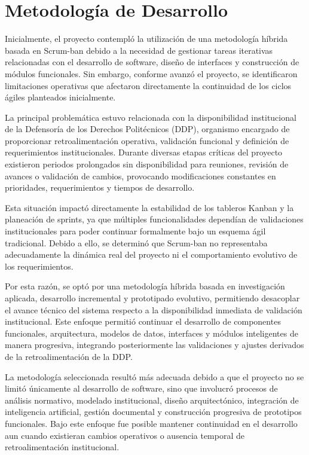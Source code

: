 
\chapter{Metodología de Desarrollo}
\label{cap:metodologia}
\justifying

Inicialmente, el proyecto contempló la utilización de una metodología híbrida basada en Scrum-ban debido a la necesidad de gestionar tareas iterativas relacionadas con el desarrollo de software, diseño de interfaces y construcción de módulos funcionales. Sin embargo, conforme avanzó el proyecto, se identificaron limitaciones operativas que afectaron directamente la continuidad de los ciclos ágiles planteados inicialmente.

La principal problemática estuvo relacionada con la disponibilidad institucional de la Defensoría de los Derechos Politécnicos (DDP), organismo encargado de proporcionar retroalimentación operativa, validación funcional y definición de requerimientos institucionales. Durante diversas etapas críticas del proyecto existieron periodos prolongados sin disponibilidad para reuniones, revisión de avances o validación de cambios, provocando modificaciones constantes en prioridades, requerimientos y tiempos de desarrollo.

Esta situación impactó directamente la estabilidad de los tableros Kanban y la planeación de sprints, ya que múltiples funcionalidades dependían de validaciones institucionales para poder continuar formalmente bajo un esquema ágil tradicional. Debido a ello, se determinó que Scrum-ban no representaba adecuadamente la dinámica real del proyecto ni el comportamiento evolutivo de los requerimientos.

Por esta razón, se optó por una metodología híbrida basada en investigación aplicada, desarrollo incremental y prototipado evolutivo, permitiendo desacoplar el avance técnico del sistema respecto a la disponibilidad inmediata de validación institucional. Este enfoque permitió continuar el desarrollo de componentes funcionales, arquitectura, modelos de datos, interfaces y módulos inteligentes de manera progresiva, integrando posteriormente las validaciones y ajustes derivados de la retroalimentación de la DDP.

La metodología seleccionada resultó más adecuada debido a que el proyecto no se limitó únicamente al desarrollo de software, sino que involucró procesos de análisis normativo, modelado institucional, diseño arquitectónico, integración de inteligencia artificial, gestión documental y construcción progresiva de prototipos funcionales. Bajo este enfoque fue posible mantener continuidad en el desarrollo aun cuando existieran cambios operativos o ausencia temporal de retroalimentación institucional.

